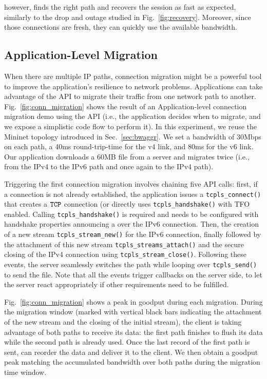\tcpls however, finds the right path and recovers the session as fast as
expected, similarly to the drop and \rst outage studied in Fig.~\ref{fig:recovery}. Moreover, since those connections are fresh, they can quickly use the available bandwidth.

\subsection{Application-Level Migration}

When there are multiple IP paths, connection migration might be a
powerful tool to improve the application's resilience to network problems. Applications can take advantage of the \tcpls API to migrate their traffic from one network path to another. Fig.~\ref{fig:conn_migration} shows the result of an Application-level connection migration demo using the API (i.e., the application decides when to migrate, and we expose a simplistic code flow to perform it). In this experiment, we reuse the Mininet topology introduced in Sec.~\ref{sec:bwaggr}. We set a bandwidth of 30Mbps on each path, a 40ms round-trip-time for the v4 link, and 80ms for the v6 link. Our application downloads
a 60MB file from a server and migrates twice (i.e., from the IPv4 to the IPv6 path and once again to the IPv4 path).

Triggering the first connection migration involves chaining five API calls: first, if a \tcp connection is not already established, the application issues a
\texttt{tcpls\_connect()} that creates a $\texttt{TCP}$ connection (or directly uses
\texttt{tcpls\_handshake()} with TFO enabled. Calling \texttt{tcpls\_handshake()} is required and needs to be configured with handshake properties announcing a \join over the IPv6 connection. Then, the creation of a new stream \texttt{tcpls\_stream\_new()} for the IPv6 connection, finally followed by the attachment of this new stream \texttt{tcpls\_streams\_attach()} and the secure closing of the IPv4 \tcp connection using \texttt{tcpls\_stream\_close()}. Following these events, the server seamlessly switches the path while looping over \texttt{tcpls\_send()} to send the file. Note that all the events trigger callbacks on the server side, to let the server react appropriately if other requirements need to be fulfilled.

Fig.~\ref{fig:conn_migration} shows a peak in goodput during each migration. During the migration window (marked with vertical black bars indicating the attachment of the new stream and the closing of the initial stream), the client is taking advantage of both paths to receive its data: the first path finishes to flush its data while the second path is already used. Once the last record of the first path is sent, \tcpls can reorder the data and deliver it to the client. We then obtain a goodput peak matching the accumulated bandwidth over both paths during the migration time window.

